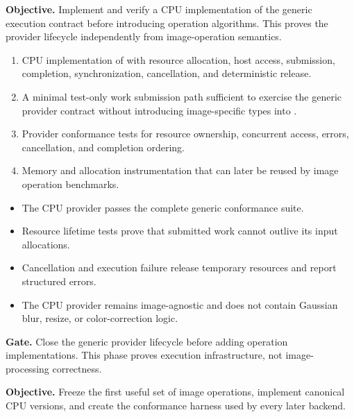 
\textbf{Objective.} Implement and verify a CPU implementation of the generic execution contract before introducing operation algorithms. This proves the provider lifecycle independently from image-operation semantics.

\deliverables
\begin{enumerate}
  \item CPU implementation of \GEP{} with resource allocation, host access, submission, completion, synchronization, cancellation, and deterministic release.
  \item A minimal test-only work submission path sufficient to exercise the generic provider contract without introducing image-specific types into \GEP{}.
  \item Provider conformance tests for resource ownership, concurrent access, errors, cancellation, and completion ordering.
  \item Memory and allocation instrumentation that can later be reused by image operation benchmarks.
\end{enumerate}

\exitcriteria
\begin{itemize}
  \item The CPU provider passes the complete generic \GEP{} conformance suite.
  \item Resource lifetime tests prove that submitted work cannot outlive its input allocations.
  \item Cancellation and execution failure release temporary resources and report structured errors.
  \item The CPU provider remains image-agnostic and does not contain Gaussian blur, resize, or color-correction logic.
\end{itemize}

\textbf{Gate.} Close the generic provider lifecycle before adding operation implementations. This phase proves execution infrastructure, not image-processing correctness.


\textbf{Objective.} Freeze the first useful set of image operations, implement canonical CPU versions, and create the conformance harness used by every later backend.

